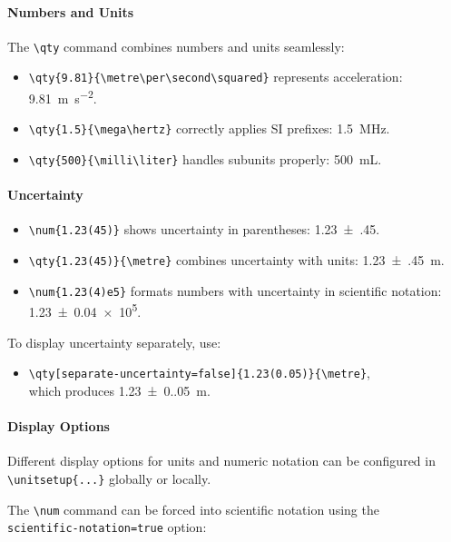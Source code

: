     \paragraph*{Numbers and Units}
        The \verb|\qty| command combines numbers and units seamlessly:
        \begin{itemize}
            \item \verb|\qty{9.81}{\metre\per\second\squared}| represents acceleration: \qty{9.81}{\metre\per\second\squared}.
            \item \verb|\qty{1.5}{\mega\hertz}| correctly applies SI prefixes: \qty{1.5}{\mega\hertz}.
            \item \verb|\qty{500}{\milli\liter}| handles subunits properly: \qty{500}{\milli\liter}.
        \end{itemize}

    \paragraph*{Uncertainty}
        \begin{itemize}
            \item \verb|\num{1.23(45)}| shows uncertainty in parentheses: \num{1.23(45)}.
            \item \verb|\qty{1.23(45)}{\metre}| combines uncertainty with units: \qty{1.23(45)}{\metre}.
            \item \verb|\num{1.23(4)e5}| formats numbers with uncertainty in scientific notation: \num{1.23(4)e5}.
        \end{itemize}
        To display uncertainty separately, use:
        \begin{itemize}
            \item \verb|\qty[separate-uncertainty=false]{1.23(0.05)}{\metre}|, \\
            which produces \qty[separate-uncertainty=false]{1.23(0.05)}{\metre}.
        \end{itemize}


    \paragraph*{Display Options}
        Different display options for units and numeric notation can be configured in \\
         \verb|\unitsetup{...}| globally or locally.

        The \verb|\num| command can be forced into scientific notation using the\\
        \verb|scientific-notation=true| option:

